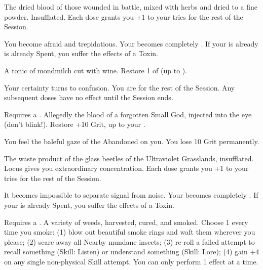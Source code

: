 
    The dried blood of those wounded in battle, mixed with herbs and dried to a fine powder.  Insufflated. Each dose grants you +1 to your \VIG tries for the rest of the Session.

     You become afraid and trepidatious. Your \PRE becomes completely . If your \PRE is already is already Spent, you suffer the effects of a  Toxin.


   A tonic of mondmilch cut with wine. Restore 1 \UD of \CLR (up to \MAX).

   Your certainty turns to confusion. You are  for the rest of the Session. Any subsequent doses have no effect until the Session ends.



  Requires a . Allegedly the blood of a forgotten Small God, injected into the eye (don't blink!). Restore +10 Grit, up to your \MAX.

   You feel the baleful gaze of the Abandoned on you. You lose 10 Grit permanently.




  The waste product of the glass beetles of the Ultraviolet Grasslands, insufflated.  Locus gives you extraordinary concentration.  Each dose grants you +1 to your \FOC tries for the rest of the Session.

    It becomes impossible to separate signal from noise.   Your \CLR becomes completely . If your \CLR is already Spent, you suffer the effects of a  Toxin.



  Requires a . A variety of weeds, harvested, cured, and smoked. Choose 1 every time you smoke: (1) blow out beautiful smoke rings and waft them wherever you please; (2) scare away all Nearby mundane insects; (3) re-roll a failed attempt to recall something (Skill: Listen) or understand something (Skill: Lore); (4) gain +4 on any single non-physical Skill \RO attempt.  You can only perform 1 effect at a time.  

